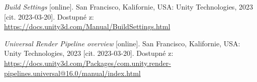 \begin{flushleft}
\begin{thebibliography}{99}
\textit{Build Settings} [online]. San Francisco, Kalifornie, USA: Unity Technologies, 2023 [cit. 2023-03-20]. Dostupné z: \href{https://docs.unity3d.com/Manual/BuildSettings.html}{https://docs.unity3d.com/Manual/BuildSettings.html}

\textit{Universal Render Pipeline overview} [online]. San Francisco, Kalifornie, USA: Unity Technologies, 2023 [cit. 2023-03-20]. Dostupné z: \href{https://docs.unity3d.com/Packages/com.unity.render-pipelines.universal@16.0/manual/index.html}{https://docs.unity3d.com/Packages/com.unity.render-pipelines.universal@16.0/manual/index.html}

\end{thebibliography}
\end{flushleft}